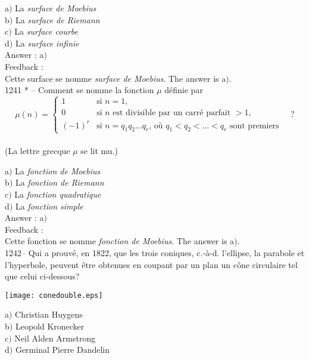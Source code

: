 ﻿\documentclass[letterpaper, 12pt]{article}
\begin{document}
a$)$ La {\sl surface de Moebius} \\
b$)$ La {\sl surface de Riemann} \\
c$)$ La {\sl surface courbe} \\
d$)$ La {\sl surface infinie}\\

Answer : a$)$\\

Feedback : \\
Cette surface se nomme {\sl surface de Moebius}.
The answer is a$)$.\\

1241 * -- Comment se nomme la fonction $\mu$ d\'efinie par
$$\mu(n)=\begin{cases}
1&\text{si $n=1$,}\\[3mm]
0&\text{si $n$ est divisible par un carr\'e parfait $>1$,}\\[3mm]
(-1)^r&\text{si $n=q_1q_2\ldots q_r$, o\`u $q_1<q_2<\ldots<q_r$ sont
premiers}
\end{cases}\quad?$$\\
(La lettre grecque $\mu$ se lit mu.)

a$)$ La {\sl fonction de Moebius} \\
b$)$ La {\sl fonction de Riemann} \\
c$)$ La {\sl fonction quadratique} \\
d$)$ La {\sl fonction simple}\\

Answer : a$)$\\

Feedback : \\
Cette fonction se nomme {\sl fonction de Moebius}.
The answer is a$)$.\\

1242-- Qui a prouv\'e, en 1822, que les trois coniques, c.-\`a-d.
l'ellipse, la parabole et l'hyperbole, peuvent \^etre obtenues en
coupant par un plan un c\^one circulaire tel que celui ci-dessous?
    \begin{center}
    \texttt{[image: conedouble.eps]}
    \end{center}


a$)$ Christian Huygens \\
b$)$ Leopold Kronecker \\
c$)$ Neil Alden Armstrong \\
d$)$ Germinal Pierre Dandelin\\
\end{document}
